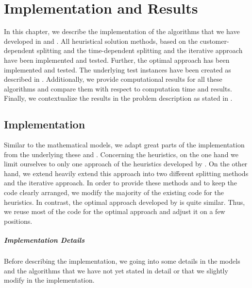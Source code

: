 \chapter{Implementation and Results}
\label{ch:implementation_results}

In this chapter, we describe the implementation of the algorithms that we have developed in  and . All heuristical solution methods, based on the customer-dependent splitting and the time-dependent splitting and the iterative approach have been implemented and tested. Further, the optimal approach has been implemented and tested. The underlying test instances have been created as described in . Additionally, we provide computational results for all these algorithms and compare them with respect to computation time and results. Finally, we contextualize the results in the problem description as stated in .


\section{Implementation}
\label{sec:implementation}

Similar to the mathematical models, we adapt great parts of the implementation from the underlying these \cite{Kaiser} and \cite{Knoll}. Concerning the heuristics, on the one hand we limit ourselves to only one approach of the heuristics developed by \cite{Knoll}. On the other hand, we extend heavily extend this approach into two different splitting methods and the iterative approach. In order to provide these methods and to keep the code clearly arranged, we modify the majority of the existing code for the heuristics. In contrast, the optimal approach developed by \cite{Kaiser} is quite similar. Thus, we reuse most of the code for the optimal approach and adjust it on a few positions. 

\paragraph{Implementation Details} \parfill

Before describing the implementation, we going into some details in the models and the algorithms that we have not yet stated in detail or that we slightly modify in the implementation.

